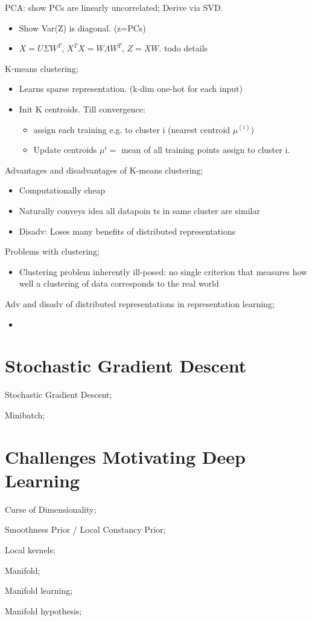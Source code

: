 \documentclass{article}
\begin{document}
PCA: show PCs are linearly uncorrelated; Derive via SVD. \begin{itemize} \item Show Var(Z) is diagonal. (z=PCs) \item $X = U\Sigma W^T$, $X^TX = W\Lambda W^T$, $Z=XW$. todo details \end{itemize}

K-means clustering; \begin{itemize} \item Learns sparse representation. (k-dim one-hot for each input) \item Init K centroids. Till convergence: \begin{itemize} \item assign each training e.g. to cluster i (nearest centroid $\mu^{(i)}$) \item Update centroids $\mu^{i}=$ mean of all training points assign to cluster i.  \end{itemize} \end{itemize}

Advantages and disadvantages of K-means clustering; \begin{itemize} \item Computationally cheap \item Naturally conveys idea all datapoin ts in same cluster are similar \item Disadv: Loses many benefits of distributed representations \end{itemize}

Problems with clustering; \begin{itemize} \item Clustering problem inherently ill-posed: no single criterion that measures how well a clustering of data corresponds to the real world \end{itemize}

Adv and disadv of distributed representations in representation learning; \begin{itemize}
	\item 
\end{itemize}

\section{Stochastic Gradient Descent}

Stochastic Gradient Descent;

Minibatch;

\section{Challenges Motivating Deep Learning}

Curse of Dimensionality;

Smoothness Prior / Local Constancy Prior;

Local kernels;

Manifold;

Manifold learning;

Manifold hypothesis;
\end{document}
